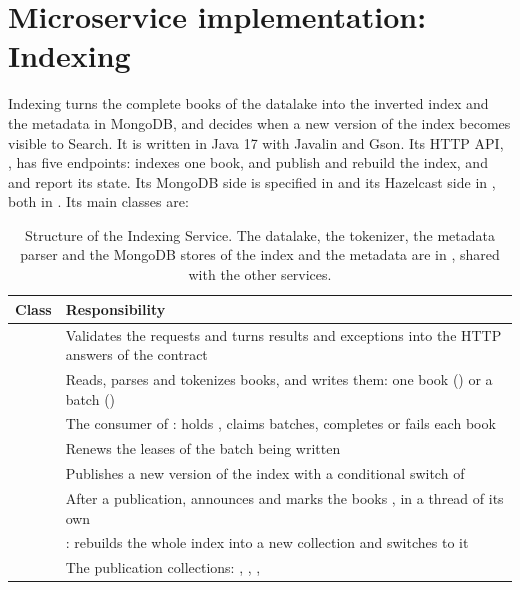 \section{Microservice implementation: Indexing}
\label{sec:indexing}

Indexing turns the complete books of the datalake into the inverted index and the metadata in MongoDB, and decides
when a new version of the index becomes visible to Search. It is written in Java 17 with Javalin and Gson. Its HTTP
API, , has five endpoints:  indexes one book,
 and  publish and rebuild the index, and 
and  report its state. Its MongoDB side is specified in  and its
Hazelcast side in , both in . Its main classes are:

\begin{table}[H]
\centering\small
\begin{tabularx}{\linewidth}{@{}L{5.3cm}>{\raggedright\arraybackslash}X@{}}
\toprule
\textbf{Class} & \textbf{Responsibility} \\
\midrule
{} & Validates the requests and turns results and exceptions into the HTTP answers of the contract \\
 & Reads, parses and tokenizes books, and writes them: one book () or a batch
  () \\
 & The consumer of : holds , claims batches, completes or
  fails each book \\
 & Renews the leases of the batch being written \\
 & Publishes a new version of the index with a conditional switch of  \\
 & After a publication, announces  and marks the books
  , in a thread of its own \\
 & : rebuilds the whole index into a new collection and switches to it \\
 & The publication collections: , ,
  ,  \\
\bottomrule
\end{tabularx}
\caption{Structure of the Indexing Service. The datalake, the tokenizer, the metadata parser and the MongoDB stores of
the index and the metadata are in , shared with the other services.}
\end{table}

